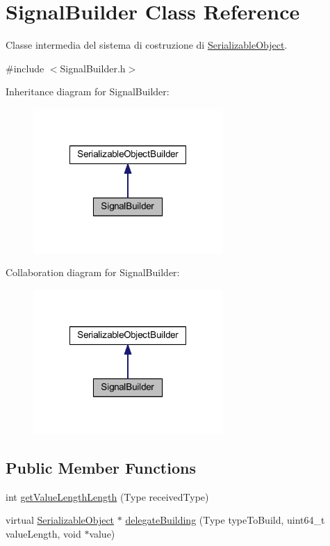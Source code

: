 \hypertarget{class_signal_builder}{
\section{SignalBuilder Class Reference}
\label{class_signal_builder}
}


Classe intermedia del sistema di costruzione di \hyperlink{class_serializable_object}{SerializableObject}.  




{\ttfamily \#include $<$SignalBuilder.h$>$}



Inheritance diagram for SignalBuilder:\nopagebreak
\begin{figure}[H]
\begin{center}
\leavevmode
\includegraphics[width=204pt]{class_signal_builder__inherit__graph}
\end{center}
\end{figure}


Collaboration diagram for SignalBuilder:\nopagebreak
\begin{figure}[H]
\begin{center}
\leavevmode
\includegraphics[width=204pt]{class_signal_builder__coll__graph}
\end{center}
\end{figure}
\subsection*{Public Member Functions}
\begin{DoxyCompactItemize}
\item 
int \hyperlink{class_signal_builder_a03c1ec556aa71efa218f719ec74bd8cb}{getValueLengthLength} (Type receivedType)
\item 
virtual \hyperlink{class_serializable_object}{SerializableObject} $\ast$ \hyperlink{class_signal_builder_a6e5251437773683fbe36c362762cf0b5}{delegateBuilding} (Type typeToBuild, uint64\_\-t valueLength, void $\ast$value)
\end{DoxyCompactItemize}


